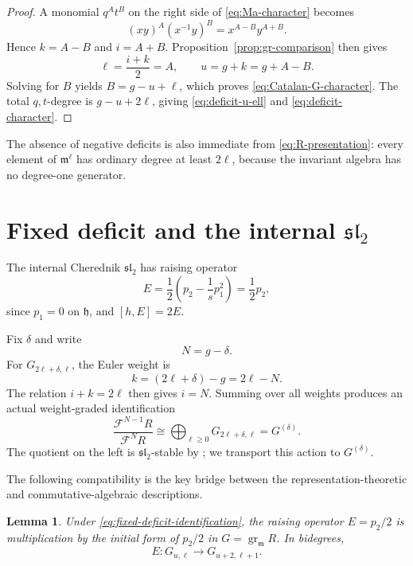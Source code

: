 \documentclass[11pt]{article}
\newtheorem{lemma}[theorem]{Lemma}
\newcommand{\gr}{\operatorname{gr}}
\begin{document}
\begin{proof}
A monomial $q^At^B$ on the right side of
\eqref{eq:Ma-character} becomes
\[
 (xy)^A(x^{-1}y)^B=x^{A-B}y^{A+B}.
\]
Hence $k=A-B$ and $i=A+B$.  Proposition~\ref{prop:gr-comparison}
then gives
\[
 \ell=\frac{i+k}{2}=A,
 \qquad
 u=g+k=g+A-B.
\]
Solving for $B$ yields $B=g-u+\ell$, which proves
\eqref{eq:Catalan-G-character}.  The total $q,t$-degree is
$g-u+2\ell$, giving \eqref{eq:deficit-u-ell} and
\eqref{eq:deficit-character}.
\end{proof}

The absence of negative deficits is also immediate from
\eqref{eq:R-presentation}: every element of $\mathfrak m^\ell$ has
ordinary degree at least $2\ell$, because the invariant algebra has no
degree-one generator.

\section{Fixed deficit and the internal \texorpdfstring{$\mathfrak{sl}_2$}{sl2}}
\label{sec:sl2}

The internal Cherednik $\mathfrak{sl}_2$ has raising operator
\begin{equation}\label{eq:E-p2}
 E=\frac12\left(p_2-\frac1s p_1^2\right)=\frac12p_2,
\end{equation}
since $p_1=0$ on $\mathfrak h$, and $[h,E]=2E$.

Fix $\delta$ and write
\[
 N=g-\delta.
\]
For $G_{2\ell+\delta,\ell}$, the Euler weight is
\[
 k=(2\ell+\delta)-g=2\ell-N.
\]
The relation $i+k=2\ell$ then gives $i=N$.  Summing over all weights
produces an actual weight-graded identification
\begin{equation}\label{eq:fixed-deficit-identification}
 \frac{\mathcal F^{N-1}R}{\mathcal F^NR}
 \cong
 \bigoplus_{\ell\geq0}G_{2\ell+\delta,\ell}
 =G^{(\delta)}.
\end{equation}
The quotient on the left is $\mathfrak{sl}_2$-stable by
\cite[Proposition~4.5]{GORS}; we transport this action to
$G^{(\delta)}$.

The following compatibility is the key bridge between the
representation-theoretic and commutative-algebraic descriptions.

\begin{lemma}\label{lem:E-compatibility}
Under \eqref{eq:fixed-deficit-identification}, the raising operator
$E=p_2/2$ is multiplication by the initial form of $p_2/2$ in
$G=\gr_{\mathfrak m}R$.  In bidegrees,
\begin{equation}\label{eq:E-bidegree}
 E:G_{u,\ell}\longrightarrow G_{u+2,\ell+1}.
\end{equation}
\end{lemma}
\end{document}

